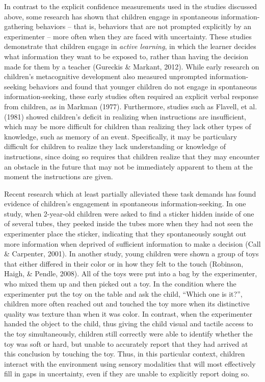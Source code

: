 \documentclass[floatsintext,man]{apa6}
\theoremstyle{definition}
\theoremstyle{definition}
\theoremstyle{definition}
\theoremstyle{remark}
\begin{document}
In contrast to the explicit confidence measurements used in the studies
discussed above, some research has shown that children engage in
spontaneous information-gathering behaviors -- that is, behaviors that
are not prompted explicitly by an experimenter -- more often when they
are faced with uncertainty. These studies demonstrate that children
engage in \emph{active learning}, in which the learner decides what
information they want to be exposed to, rather than having the decision
made for them by a teacher (Gureckis \& Markant, 2012). While early
research on children's metacognitive development also measured
unprompted information-seeking behaviors and found that younger children
do not engage in spontaneous information-seeking, these early studies
often required an explicit verbal response from children, as in Markman
(1977). Furthermore, studies such as Flavell, et al. (1981) showed
children's deficit in realizing when instructions are insufficient,
which may be more difficult for children than realizing they lack other
types of knowledge, such as memory of an event. Specifically, it may be
particulary difficult for children to realize they lack understanding or
knowledge of instructions, since doing so requires that children realize
that they may encounter an obstacle in the future that may not be
immediately apparent to them at the moment the instructions are given.

Recent research which at least partially alleviated these task demands
has found evidence of children's engagement in spontaneous
information-seeking. In one study, when 2-year-old children were asked
to find a sticker hidden inside of one of several tubes, they peeked
inside the tubes more when they had not seen the experimenter place the
sticker, indicating that they spontaneously sought out more information
when deprived of sufficient information to make a decision (Call \&
Carpenter, 2001). In another study, young children were shown a group of
toys that either differed in their color or in how they felt to the
touch (Robinson, Haigh, \& Pendle, 2008). All of the toys were put into
a bag by the experimenter, who mixed them up and then picked out a toy.
In the condition where the experimenter put the toy on the table and ask
the child, \enquote{Which one is it?}, children more often reached out
and touched the toy more when its distinctive quality was texture than
when it was color. In contrast, when the experimenter handed the object
to the child, thus giving the child visual and tactile access to the toy
simultaneously, children still correctly were able to identify whether
the toy was soft or hard, but unable to accurately report that they had
arrived at this conclusion by touching the toy. Thus, in this particular
context, children interact with the environment using sensory modalities
that will most effectively fill in gaps in uncertainty, even if they are
unable to explicitly report doing so.
\end{document}
